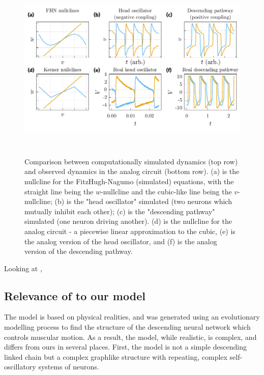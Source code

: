 \documentclass[
    11pt,
]{article}
\begin{document}
\begin{figure}[h!]
    \centering
    \pgfplotsset{}
    \includegraphics[height=9cm]{figures/anal_sim_comp/anal_sim_comp.pdf}
    \caption{Comparison between computationally simulated dynamics (top row) and observed dynamics in the analog circuit (bottom row).  (a) is the nullcline for the FitzHugh-Nagumo (simulated) equations, with the straight line being the $w$-nullcline and the cubic-like line being the $v$-nullcline; (b) is the "head oscillator" simulated (two neurons which mutually inhibit each other); (c) is the "descending pathway" simulated (one neuron driving another).  (d) is the nullcline for the analog circuit - a piecewise linear approximation to the cubic, (e) is the analog version of the head oscillator, and (f) is the analog version of the descending pathway.}
    \label{fig: anal_sim_comp}
\end{figure}

Looking at , 

\subsection{Relevance of \citet{izquierdo2018} to our model}

The \citet{izquierdo2018} model is based on physical realities, and was generated using an evolutionary modelling process to find the structure of the descending neural network which controls muscular motion.  As a result, the model, while realistic, is complex, and differs from ours in several places.  First, the model is not a simple descending linked chain but a complex graphlike structure with repeating, complex self-oscillatory systems of neurons.
\end{document}
